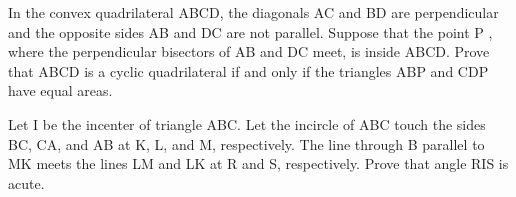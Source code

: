 \item In the convex quadrilateral ABCD, the diagonals AC and BD are perpendicular and the opposite sides AB and DC are not parallel. Suppose that the point P , where the perpendicular bisectors of AB and DC meet, is inside ABCD. Prove that ABCD is a cyclic quadrilateral if and only if the triangles ABP and CDP have equal areas.\\


\item Let I be the incenter of triangle ABC. Let the incircle of ABC touch the sides BC, CA, and AB at K, L, and M, respectively. The line through B parallel to MK meets the lines LM and LK at R and S, respectively. Prove that angle RIS is acute.


